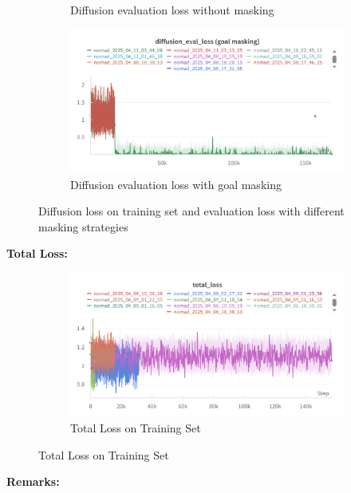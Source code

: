 \documentclass[12pt]{article}
\begin{document}
\begin{figure}[H]
\begin{subfigure}[H]{0.48\textwidth}
        \caption{Diffusion evaluation loss without masking}
        \label{fig:diffusion_eval_loss_no_masking}
    \end{subfigure}
    \hfill
    \begin{subfigure}[H]{0.48\textwidth}
        \centering
        \includegraphics[width=\textwidth]{images/diffusion_eval_loss_goal_masking.png}
        \caption{Diffusion evaluation loss with goal masking}
        \label{fig:diffusion_eval_loss_goal_masking}
    \end{subfigure}
    \caption{Diffusion loss on training set and evaluation loss with different masking strategies}
    \end{figure}
\noindent \textbf{Total Loss:}\\
\begin{figure}[H]
    \centering
    \begin{subfigure}[b]{0.48\textwidth}
        \centering
        \includegraphics[width=\textwidth]{images/total_loss.png}
        \caption{Total Loss on Training Set}
        \label{fig:total_loss}
    \end{subfigure}
    \end{figure}
\noindent \textbf{Remarks:}\\
\end{document}
